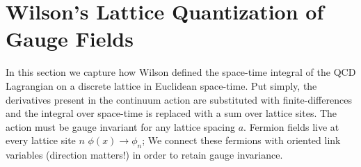 \section{Wilson's Lattice Quantization of Gauge Fields}
In this section we capture how Wilson defined the space-time integral of the QCD Lagrangian on a discrete lattice in Euclidean space-time. Put simply, the derivatives present in the continuum action are substituted with finite-differences and the integral over space-time is replaced with a sum over lattice sites. The action must be gauge invariant for any lattice spacing $a$. Fermion fields live at every lattice site $n$ $\phi(x) \rightarrow \phi_n$; We connect these fermions with oriented link variables (direction matters!) in order to retain gauge invariance. 
\begin{center}
    \end{center}

\begin{center}
    \end{center}

